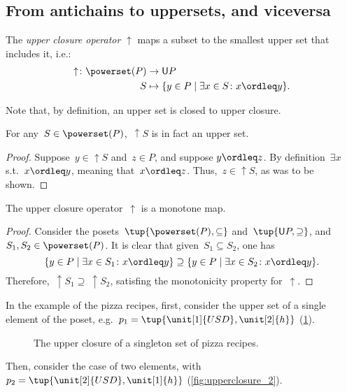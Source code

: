 \subsection{From antichains to uppersets, and viceversa}
\begin{definition}
\label{def:upperclosure}
The \emph{upper closure operator} $\uparrow$ maps a subset to the smallest upper set that includes it, i.e.:
\begin{equation}
    \begin{aligned}
    \uparrow \colon \powerset(P)&\to \mathsf{U}P\\
    S&\mapsto \{y\in P \mid \exists x\in S \colon x\ordleq y\}.
    \end{aligned}
\end{equation}
\end{definition}
\begin{remark}
Note that, by definition, an upper set is closed to upper closure.
\end{remark}
\begin{remark}
For any~$S\in \powerset(P)$,~$\uparrow S$ is in fact an upper set.
\begin{proof}
Suppose~$y\in \uparrow S$ and~$z\in P$, and suppose $y\ordleq z$. By definition~$\exists x$ s.t.~$x\ordleq y$, meaning that~$x\ordleq z$. Thus,~$z\in \uparrow S$, as was to be shown.
\end{proof}
\end{remark}

\begin{lemma}
The upper closure operator~$\uparrow$ is a monotone map.
\end{lemma}
\begin{proof}
Consider the posets~$\tup{\powerset(P),\subseteq}$ and~$\tup{\mathsf{U}P,\supseteq}$, and~$S_1,S_2\in \powerset(P)$. It is clear that given~$S_1\subseteq S_2$, one has
\begin{equation}
    \{y\in P\mid \exists x\in S_1\colon x\ordleq y\} \supseteq \{y\in P\mid \exists x\in S_2\colon x\ordleq y\}.
\end{equation}
Therefore,~$\uparrow S_1\supseteq \ \uparrow S_2$, satisfing the monotonicity property for~$\uparrow$.
\end{proof}

In the example of the pizza recipes, first, consider the upper set of a single element of the poset, e.g.~$p_1=\tup{\unit[1]{USD},\unit[2]{h}}$  (\cref{fig:upperclosure_1}).
\begin{figure}[h!]
\begin{center}
\end{center}
\caption{The upper closure of a singleton set of pizza recipes. \label{fig:upperclosure_1}}
\end{figure}
Then, consider the case of two elements, with~$p_2=\tup{\unit[2]{USD},\unit[1]{h}}$ (\cref{fig:upperclosure_2}).

